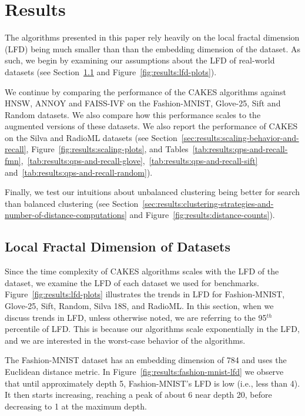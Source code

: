 \section{Results}
\label{sec:results}

The algorithms presented in this paper rely heavily on the local fractal dimension (LFD) being much smaller than than the embedding dimension of the dataset.
As such, we begin by examining our assumptions about the LFD of real-world datasets (see Section~\ref{sec:results:lfd-of-datasets} and Figure~\ref{fig:results:lfd-plots}).

We continue by comparing the performance of the CAKES algorithms against HNSW, ANNOY and FAISS-IVF on the Fashion-MNIST, Glove-25, Sift and Random datasets.
We also compare how this performance scales to the augmented versions of these datasets.
We also report the performance of CAKES on the Silva and RadioML datasets (see Section~\ref{sec:results:scaling-behavior-and-recall}, Figure~\ref{fig:results:scaling-plots}, and Tables~\ref{tab:results:qps-and-recall-fmn},~\ref{tab:results:qps-and-recall-glove},~\ref{tab:results:qps-and-recall-sift} and~\ref{tab:results:qps-and-recall-random}).

Finally, we test our intuitions about unbalanced clustering being better for search
than balanced clustering (see Section~\ref{sec:results:clustering-strategies-and-number-of-distance-computations} and Figure~\ref{fig:results:distance-counts}).


\subsection{Local Fractal Dimension of Datasets}
\label{sec:results:lfd-of-datasets}

Since the time complexity of CAKES algorithms scales with the LFD of the dataset, we examine the LFD of each dataset we used for benchmarks.
Figure~\ref{fig:results:lfd-plots} illustrates the trends in LFD for Fashion-MNIST, Glove-25, Sift, Random, Silva 18S, and RadioML.
In this section, when we discuss trends in LFD, unless otherwise noted, we are referring to the 95$^{th}$ percentile of LFD.
This is because our algorithms scale exponentially in the LFD, and we are interested in the worst-case behavior of the algorithms.

The Fashion-MNIST dataset has an embedding dimension of 784 and uses the Euclidean distance metric.
In Figure~\ref{fig:results:fashion-mnist-lfd} we observe that until approximately depth 5, Fashion-MNIST's LFD is low (i.e., less than 4).
It then starts increasing, reaching a peak of about 6 near depth 20, before decreasing to 1 at the maximum depth.

